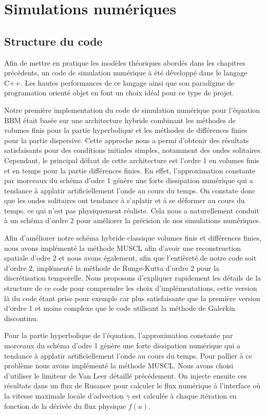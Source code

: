 \chapter{Simulations numériques}


\section{Structure du code}

Afin de mettre en pratique les modèles théoriques abordés dans les chapitres précédents, un code de simulation numérique à été développé dans le langage C++. Les hautes performances de ce langage ainsi que son paradigme de programation orienté objet en font un choix idéal pour ce type de projet.

Notre première implementation du code de simulation numérique pour l'équation BBM était basée sur une architecture hybride combinant les méthodes de volumes finis pour la partie hyperbolique et les méthodes de différences finies pour la partie dispersive. Cette approche nous a permi d'obtenir des résultats satisfaisants pour des conditions initiales simples, notamment des ondes solitaires. Cependant, le principal défaut de cette architecture est l'ordre 1 en volumes finis et en temps pour la partie différences finies. En effet, l'approximation constante par morceaux du schéma d'odre 1 génère une forte dissipation numérique qui a tendance à applatir artificiellement l'onde au cours du temps. On constate donc que les ondes solitaires ont tendance à s'aplatir et à se déformer au cours du temps, ce qui n'est pas physiquement réaliste. Cela nous a naturellement conduit à un schéma d'ordre 2 pour améliorer la précision de nos simulations numériques.

Afin d'améliorer notre schéma hybride classique volumes finis et différences finies, nous avons implémenté la méthode MUSCL afin d'avoir une reconstruction spatiale d'odre 2 et nous avons également, afin que l'entièreté de notre code soit d'ordre 2, implémenté la méthode de Runge-Kutta d'ordre 2 pour la discrétisation temporelle. Nous proposons d'expliquer rapidement les détails de la structure de ce code pour comprendre les choix d'implémentations, cette version là du code étant prise pour exemple car plus satisfaisante que la première version d'ordre 1 et moins complexe que le code utilisant la méthode de Galerkin discontinu.

Pour la partie hyperbolique de l'équation, l'approximation constante par morceaux du schéma d'odre 1 génère une forte dissipation numérique qui a tendance à applatir artificiellement l'onde au cours du temps. Pour pallier à ce problème nous avons implémenté la méthode MUSCL. Nous avons choisi d'utiliser le limiteur de Van Leer détaillé précédement. On injecte ensuite ces résultats dans un flux de Rusanov pour calculer le flux numérique à l'interface où la vitesse maximale locale d'advection $\gamma$ est calculée à chaque itération en fonction de la dérivée du flux physique $f(u)$.

